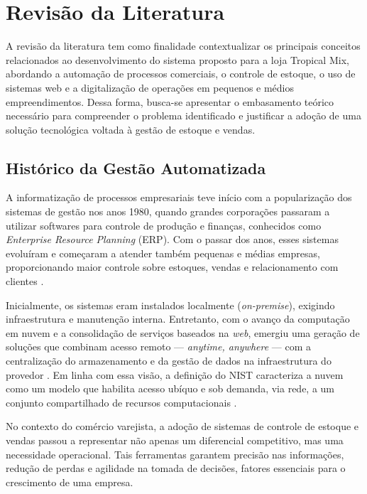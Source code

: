 \chapter{Revisão da Literatura}

A revisão da literatura tem como finalidade contextualizar os principais conceitos relacionados ao desenvolvimento do sistema proposto para a loja Tropical Mix, abordando a automação de processos comerciais, o controle de estoque, o uso de sistemas web e a digitalização de operações em pequenos e médios empreendimentos. Dessa forma, busca-se apresentar o embasamento teórico necessário para compreender o problema identificado e justificar a adoção de uma solução tecnológica voltada à gestão de estoque e vendas.

\section{Histórico da Gestão Automatizada}

A informatização de processos empresariais teve início com a popularização dos sistemas de gestão nos anos 1980, quando grandes corporações passaram a utilizar softwares para controle de produção e finanças, conhecidos como \textit{Enterprise Resource Planning} (ERP). Com o passar dos anos, esses sistemas evoluíram e começaram a atender também pequenas e médias empresas, proporcionando maior controle sobre estoques, vendas e relacionamento com clientes \cite{laudon2022}.

Inicialmente, os sistemas eram instalados localmente (\textit{on-premise}), exigindo infraestrutura e manutenção interna. Entretanto, com o avanço da computação em nuvem e a consolidação de serviços baseados na \textit{web}, emergiu uma geração de soluções que combinam acesso remoto — \textit{anytime, anywhere} — com a centralização do armazenamento e da gestão de dados na infraestrutura do provedor \cite{armbrust2009}. Em linha com essa visão, a definição do NIST caracteriza a nuvem como um modelo que habilita acesso ubíquo e sob demanda, via rede, a um conjunto compartilhado de recursos computacionais \cite{mell2011}.

No contexto do comércio varejista, a adoção de sistemas de controle de estoque e vendas passou a representar não apenas um diferencial competitivo, mas uma necessidade operacional. Tais ferramentas garantem precisão nas informações, redução de perdas e agilidade na tomada de decisões, fatores essenciais para o crescimento de uma empresa.

